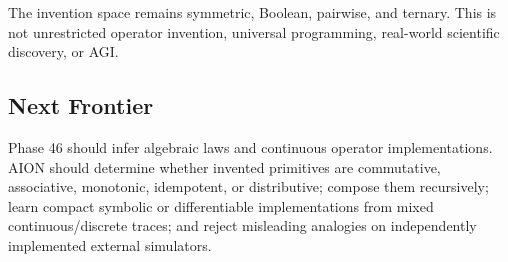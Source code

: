 The invention space remains symmetric, Boolean, pairwise, and ternary. This is
not unrestricted operator invention, universal programming, real-world
scientific discovery, or AGI.

\subsection{Next Frontier}

Phase 46 should infer algebraic laws and continuous operator implementations.
AION should determine whether invented primitives are commutative,
associative, monotonic, idempotent, or distributive; compose them recursively;
learn compact symbolic or differentiable implementations from mixed
continuous/discrete traces; and reject misleading analogies on independently
implemented external simulators.
